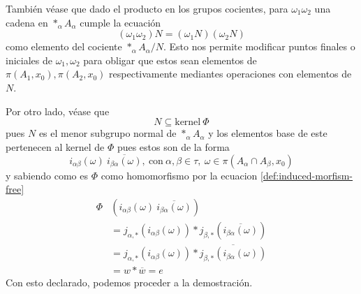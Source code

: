 También véase que dado el producto en los
grupos cocientes, para \(\omega_1 \omega_2 \) una cadena en \(*_\alpha
A_\alpha\) cumple la ecuación
\[ (\omega_1 \omega_2) N = (\omega_1 N) (\omega_2 N) \]
como elemento del cociente \(*_\alpha A_\alpha / N\). Esto nos permite
modificar puntos finales o iniciales de \(\omega_1, \omega_2\) para
obligar que estos sean elementos de \(\pi (A_1, x_0), \pi (A_2, x_0)\)
respectivamente mediantes operaciones con elementos de \(N\).

Por otro lado, véase que
\[ N \subseteq \text{kernel} \ \Phi \]
pues \(N\) es el menor subgrupo normal de \(*_\alpha A_\alpha\) y los
elementos base de este pertenecen al kernel de \(\Phi\) pues estos son
de la forma
\[ i_{\alpha \beta} (\omega) \ \overline{i_{\beta \alpha} (\omega)} ,
  \ \text{con} \ \alpha,\beta \in \tau,\ \omega \in \pi(A_\alpha \cap
  A_\beta , x_0)\]
y sabiendo como es \(\Phi\) como homomorfismo por
la ecuacion \eqref{def:induced-morfism-free}
\begin{align*}
  \Phi &\left( i_{\alpha \beta} (\omega) \ \overline{i_{\beta \alpha}
          (\omega)} \right) \\
       &= j_{\alpha,*} \left( i_{\alpha \beta} (\omega) \right) *
         j_{\beta,*} \left( \overline{i_{\beta \alpha} (\omega)} \right) \\
       &= j_{\alpha,*} \left( i_{\alpha \beta} (\omega) \right) *
         \overline{j_{\beta,*} \left( i_{\beta \alpha} (\omega) \right)} \\
       &= w * \overline{w} = e
\end{align*}
Con esto
declarado, podemos proceder a la demostración.
